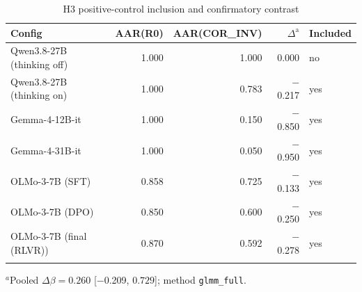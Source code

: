 \begin{table}[t]
\centering
\caption{H3 positive-control inclusion and confirmatory contrast}
\label{tab:h3}
\begin{tabular}{lrrrl}
\toprule
Config & AAR(R0) & AAR(COR\_INV) & $\Delta^{\mathrm{a}}$ & Included \\
\midrule
Qwen3.8-27B (thinking off) & 1.000 & 1.000 & 0.000 & no \\
Qwen3.8-27B (thinking on) & 1.000 & 0.783 & $-$0.217 & yes \\
Gemma-4-12B-it & 1.000 & 0.150 & $-$0.850 & yes \\
Gemma-4-31B-it & 1.000 & 0.050 & $-$0.950 & yes \\
OLMo-3-7B (SFT) & 0.858 & 0.725 & $-$0.133 & yes \\
OLMo-3-7B (DPO) & 0.850 & 0.600 & $-$0.250 & yes \\
OLMo-3-7B (final (RLVR)) & 0.870 & 0.592 & $-$0.278 & yes \\
\botrule
\end{tabular}
\begin{tablenotes}
\item $^{a}$Pooled $\Delta\beta = 0.260$ [$-$0.209, $0.729$]; method \texttt{glmm\_full}.
\end{tablenotes}
\end{table}
